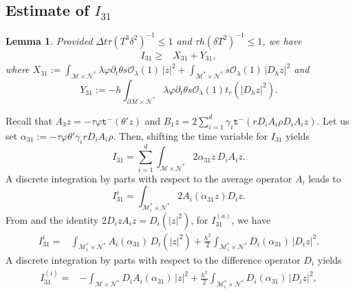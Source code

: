 \documentclass[11pt,oneside,leqno]{amsart}
\numberwithin{equation}{section}
\numberwithin{equation}{section}
\newtheorem{lemma}[theorem]{Lemma}
\newcommand{\trm}{\mathtt t^-}
\begin{document}
\subsection{Estimate of $I_{31}$}
\begin{lemma}\label{I31}
Provided $\Delta t \tau (T^3 \delta^2)^{-1}\leq 1$ and $\tau h(\delta T^{2})^{-1}\leq 1$, we have
\begin{equation*}
\begin{split}
    I_{31}\geq &X_{31}+Y_{31}
    ,
    \end{split}
\end{equation*}
where $\displaystyle X_{31}:=\int_{\mathcal{M}\times\mathcal{N}^{\ast}}\lambda\varphi\partial_{t}\theta s\mathcal{O}_{\lambda}(1)\,|z|^{2}+\int_{\mathcal{M}^{\ast}\times\mathcal{N}^{\ast}}s\mathcal{O}_{\lambda}(1)\,|D_{h}z|^{2}$ and
\begin{equation*}
    Y_{31}:=-h\int_{\partial \mathcal{M}\times\mathcal{N}^{\ast}}\lambda\varphi\partial_{t}\theta s\mathcal{O}_{\lambda}(1)t_{r}(|D_{h}z|^{2}).
\end{equation*}
\end{lemma}
Recall that 
$A_{3}z=-\tau\varphi\trm(\theta'z)$ and $B_{1}z=2\sum_{i=1}^{d}\gamma_{i}\trm(rD_{i}A_{i}\rho D_{i}A_{i}z)$. Let us set $\alpha_{31}:=-\tau\varphi\theta'\gamma_{i}rD_{i}A_{i}\rho$. Then, shifting the time variable for $I_{31}$ yields $$\displaystyle I_{31}=\sum_{i=1}^{d}\int_{\mathcal{M}\times\mathcal{N}^{\ast}}2\alpha_{31}z\,D_{i}A_{i}z.$$ A discrete integration by parts with respect to the average operator $A_{i}$ leads to
\begin{equation*}
I^{i}_{31}=\int_{\mathcal{M}_{i}^{\ast}\times\mathcal{N}^{\ast}}2A_{i}(\alpha_{31}z)D_{i}z.
\end{equation*}
From \cite[Lemma 2.1, equation (13)]{LDOP-2021} and the identity $2D_{i}zA_{i}z=D_{i}(|z|^{2})$, for $I_{31}^{(a)}$, we have
\begin{equation*}
\begin{split}
    I_{31}^{i}=&\int_{\mathcal{M}_{i}^{\ast}\times\mathcal{N}^{\ast}}A_{i}(\alpha_{31})\,D_{i}(|z|^{2})+\frac{h^{2}}{2}\int_{\mathcal{M}_{i}^{\ast}\times\mathcal{N}^{\ast}}D_{i}(\alpha_{31})\,|D_{i}z|^{2}.
    \end{split}
\end{equation*}
A discrete integration by parts with respect to the difference operator $D_{i}$ yields
\begin{equation*}
\begin{split}
    I_{31}^{(i)}=&-\int_{\mathcal{M}\times\mathcal{N}^{\ast}}D_{i}A_{i}(\alpha_{31})\,|z|^{2}+\frac{h^{2}}{2}\int_{\mathcal{M}_{i}^{\ast}\times\mathcal{N}^{\ast}}D_{i}(\alpha_{31})\,|D_{i}z|^{2},
    \end{split}
\end{equation*}
\end{document}
